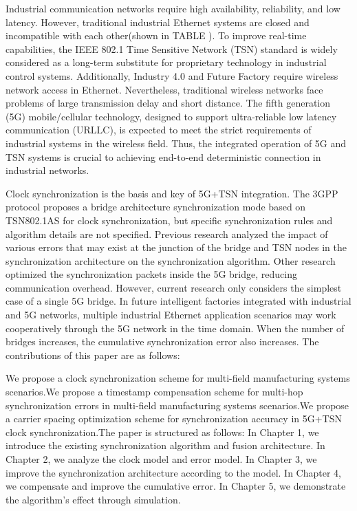 \documentclass[english]{cccconf}
\begin{document}
Industrial communication networks require high availability, reliability, and low latency. However, traditional industrial Ethernet systems are closed and incompatible with each other(shown in TABLE \uppercase\expandafter{}). To improve real-time capabilities, the IEEE 802.1 Time Sensitive Network (TSN) standard is widely considered as a long-term substitute for proprietary technology in industrial control systems. Additionally, Industry 4.0 and Future Factory require wireless network access in Ethernet. Nevertheless, traditional wireless networks face problems of large transmission delay and short distance. The fifth generation (5G) mobile/cellular technology, designed to support ultra-reliable low latency communication (URLLC), is expected to meet the strict requirements of industrial systems in the wireless field. Thus, the integrated operation of 5G and TSN systems is crucial to achieving end-to-end deterministic connection in industrial networks.

Clock synchronization is the basis and key of 5G+TSN integration. The 3GPP protocol proposes a bridge architecture synchronization mode based on TSN802.1AS for clock synchronization, but specific synchronization rules and algorithm details are not specified. Previous research analyzed the impact of various errors that may exist at the junction of the bridge and TSN nodes in the synchronization architecture on the synchronization algorithm. Other research optimized the synchronization packets inside the 5G bridge, reducing communication overhead. However, current research only considers the simplest case of a single 5G bridge. In future intelligent factories integrated with industrial and 5G networks, multiple industrial Ethernet application scenarios may work cooperatively through the 5G network in the time domain. When the number of bridges increases, the cumulative synchronization error also increases. The contributions of this paper are as follows:

We propose a clock synchronization scheme for multi-field manufacturing systems scenarios.We propose a timestamp compensation scheme for multi-hop synchronization errors in multi-field manufacturing systems scenarios.We propose a carrier spacing optimization scheme for synchronization accuracy in 5G+TSN clock synchronization.The paper is structured as follows: In Chapter 1, we introduce the existing synchronization algorithm and fusion architecture. In Chapter 2, we analyze the clock model and error model. In Chapter 3, we improve the synchronization architecture according to the model. In Chapter 4, we compensate and improve the cumulative error. In Chapter 5, we demonstrate the algorithm's effect through simulation.
\end{document}

